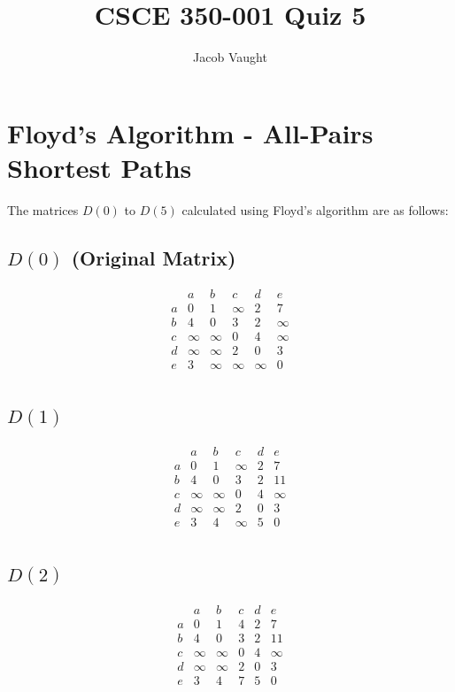\documentclass{article}
\title{CSCE 350-001 Quiz 5}
\author{Jacob Vaught}
\date{}
\begin{document}
\maketitle

\section*{Floyd's Algorithm - All-Pairs Shortest Paths}

The matrices \( D(0) \) to \( D(5) \) calculated using Floyd's algorithm are as follows:

\subsection*{\( D(0) \) (Original Matrix)}
\[
\begin{matrix}
  & a & b & c & d & e \\
a & 0 & 1 & \infty & 2 & 7 \\
b & 4 & 0 & 3 & 2 & \infty \\
c & \infty & \infty & 0 & 4 & \infty \\
d & \infty & \infty & 2 & 0 & 3 \\
e & 3 & \infty & \infty & \infty & 0 \\
\end{matrix}
\]

\subsection*{\( D(1) \)}
\[
\begin{matrix}
  & a & b & c & d & e \\
a & 0 & 1 & \infty & 2 & 7 \\
b & 4 & 0 & 3 & 2 & 11 \\
c & \infty & \infty & 0 & 4 & \infty \\
d & \infty & \infty & 2 & 0 & 3 \\
e & 3 & 4 & \infty & 5 & 0 \\
\end{matrix}
\]

\subsection*{\( D(2) \)}
\[
\begin{matrix}
  & a & b & c & d & e \\
a & 0 & 1 & 4 & 2 & 7 \\
b & 4 & 0 & 3 & 2 & 11 \\
c & \infty & \infty & 0 & 4 & \infty \\
d & \infty & \infty & 2 & 0 & 3 \\
e & 3 & 4 & 7 & 5 & 0 \\
\end{matrix}
\]
\end{document}
